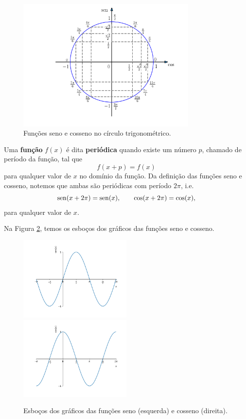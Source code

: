 \begin{figure}[H]
  \centering
  \includegraphics[width=0.8\textwidth]{./cap_funcao/dados/fig_cos_seno_valores/fig_cos_seno_valores}
  \caption{Funções seno e cosseno no círculo trigonométrico.}
  \label{fig:cos_seno_valores}
\end{figure}

Uma {\bf função} $f(x)$ é dita {\bf periódica} quando existe um número $p$, chamado de período da função, tal que
\begin{equation}
  f(x+p) = f(x)
\end{equation}
para qualquer valor de $x$ no domínio da função. Da definição das funções seno e cosseno, notemos que ambas são periódicas com período $2\pi$, i.e.
\begin{equation}
  \operatorname{sen}(x+2\pi) = \operatorname{sen}(x),\qquad \cos(x+2\pi) = \cos(x),
\end{equation}
para qualquer valor de $x$.

Na Figura \ref{fig:cos_seno_graficos}, temos os esboços dos gráficos das funções seno e cosseno.

\begin{figure}[H]
  \centering
  \includegraphics[width=0.5\textwidth]{./cap_funcao/dados/fig_cos_seno_graficos/fig_seno_grafico}~
  \includegraphics[width=0.5\textwidth]{./cap_funcao/dados/fig_cos_seno_graficos/fig_cosseno_grafico}
  \caption{Esboços dos gráficos das funções seno (esquerda) e cosseno (direita).}
  \label{fig:cos_seno_graficos}
\end{figure}

